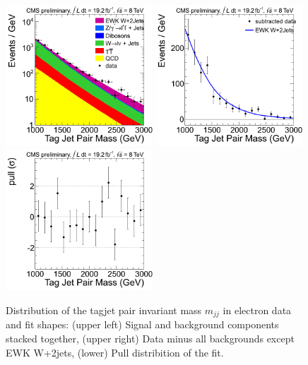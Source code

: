 \begin{figure}[h!]
  {\centering
    \includegraphics[width=0.49\textwidth]{figs/mjjfit/EWKW2jetstagjetmjj_defaultfit_electron_Stacked.png}
    \includegraphics[width=0.49\textwidth]{figs/mjjfit/EWKW2jetstagjetmjj_defaultfit_electron_Subtracted.png}
    \includegraphics[width=0.49\textwidth]{figs/mjjfit/EWKW2jetstagjetmjj_defaultfit_electron_Pull.png}
    \caption{Distribution of the tagjet pair invariant mass $m_{jj}$ in electron data and fit shapes: 
      (upper left) Signal and background components stacked together, 
      (upper right) Data minus all backgrounds except EWK W+2jets,  
      (lower) Pull distribition of the fit.}
    \label{fig:mjj_2jet_el}}
\end{figure}
